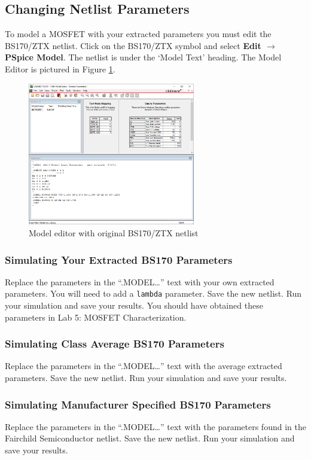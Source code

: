 \documentclass[12pt]{../manual}
\begin{document}
\newpage
\subsection{Changing Netlist Parameters}
To model a MOSFET with your extracted parameters you must edit the BS170/ZTX netlist. Click on the BS170/ZTX symbol and select \textbf{Edit $\to$ PSpice Model}. The netlist is under the `Model Text’ heading. The Model Editor is pictured in Figure \ref{fig:netlist}.

\begin{figure}[ht!]
\begin{center}
\includegraphics[width=0.65\textwidth]{figures/modelEditor}
\end{center}
\caption{Model editor with original BS170/ZTX netlist}
\label{fig:netlist}
\end{figure}

\subsubsection{Simulating Your Extracted BS170 Parameters}
Replace the parameters in the ``.MODEL\dots'' text with your own extracted parameters. You will need to add a {\tt lambda} parameter. Save the new netlist. Run your simulation and save your results. You should have obtained these parameters in Lab 5: MOSFET Characterization.

\subsubsection{Simulating Class Average BS170 Parameters}
Replace the parameters in the ``.MODEL\dots'' text with the average extracted parameters. Save the new netlist. Run your simulation and save your results.

\subsubsection{Simulating Manufacturer Specified BS170 Parameters}
Replace the parameters in the ``.MODEL\dots'' text with the parameters found in the Fairchild Semiconductor netlist. Save the new netlist. Run your simulation and save your results.
\end{document}

